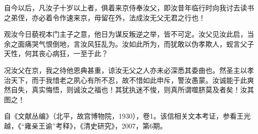 自今以后，凡汝子十岁以上者，俱着来京侍奉汝父，即汝昔年临行时向我讨去读书之弟侄，亦必着令作速来京，毋留在外，法成汝无父无君之行也！



观汝今日藐视本门主子之意，他日为谋反叛逆之举，皆不可定。汝父见汝此启，当余之面痛哭气恨倒地，言汝风狂乱为。汝如此所为，而犹敢以伪孝欺人，蚬言父子天性，何其丧心病狂，一至于此？



况汝父在京，我之待他恩典甚重，谅汝无父之人亦未必深悉其委曲也。然圣主以孝治天下，而于我惜老之夙心有所不忍，故不惜如此申斥，警汝愚蒙。汝诚能于此爽然自失，真实悔悟，则诚汝之福也！其犹执迷不悛，则真所谓噬脐莫及者矣！汝其图之！



自《文献丛编》（北平，故宫博物院，1930），卷1。该信相关文本考证，参看王光越，《“雍亲王谕”考释》，《清史研究》，2007，第6期。

